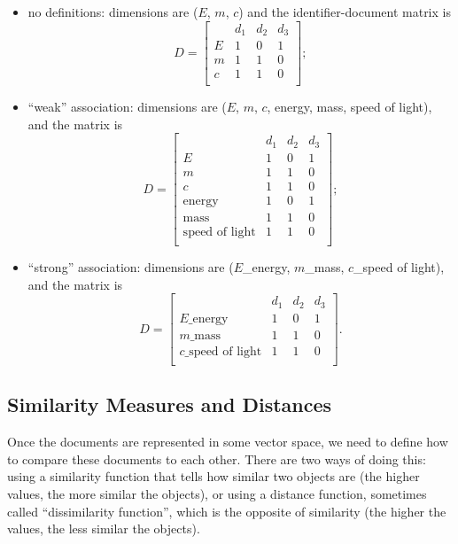 \begin{itemize}\itemsep1pt\parskip0pt
  \item no definitions: dimensions are ($E$, $m$, $c$) and the identifier-document matrix is 
  $$D = \left[
    \begin{array}{c|ccc}
       & d_1 & d_2 & d_3 \\
      \hline
      E & 1 & 0 & 1  \\
      m & 1 & 1 & 0 \\
      c & 1 & 1 & 0 \\
    \end{array}
  \right];$$
  \item ``weak'' association: dimensions are ($E$, $m$, $c$, energy, mass, 
  speed of light), and the matrix is $$D = \left[
    \begin{array}{r|ccc}
       & d_1 & d_2 & d_3 \\
      \hline
      E                     & 1 & 0 & 1  \\
      m                     & 1 & 1 & 0 \\
      c                     & 1 & 1 & 0 \\
      \text{energy}         & 1 & 0 & 1  \\
      \text{mass}           & 1 & 1 & 0 \\
      \text{speed of light} & 1 & 1 & 0 \\
    \end{array}
  \right];$$
  \item ``strong'' association: dimensions are ($E$\_energy, $m$\_mass, $c$\_speed of light), and the matrix is $$D = \left[
    \begin{array}{r|ccc}
       & d_1 & d_2 & d_3 \\
      \hline
      E\text{\_energy} & 1 & 0 & 1  \\
      m\text{\_mass} & 1 & 1 & 0 \\
      c\text{\_speed of light} & 1 & 1 & 0 \\
    \end{array}
  \right].$$
\end{itemize}


\subsection{Similarity Measures and Distances} \label{sec:similarity-distance}

Once the documents are represented in some vector space, we need to
define how to compare these documents to each other. There are two
ways of doing this: using a similarity function that tells how similar
two objects are (the higher values, the more similar the objects),
or using a distance function, sometimes called ``dissimilarity function'',
which is the opposite of similarity (the higher the values, the less similar
the objects).

